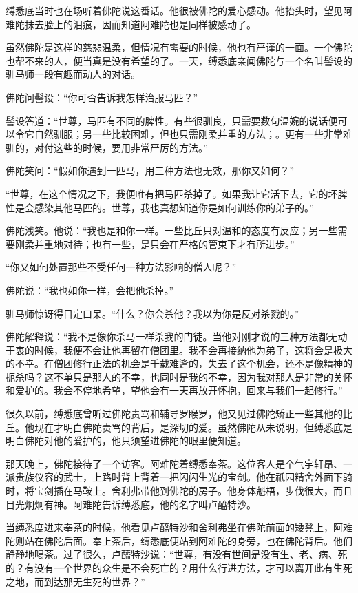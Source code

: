 \documentclass[12pt,twoside,openany]{book}
\begin{document}
缚悉底当时也在场听着佛陀说这番话。他很被佛陀的爱心感动。他抬头时，望见阿难陀抹去脸上的泪痕，因而知道阿难陀也是同样被感动了。

虽然佛陀是这样的慈悲温柔，但情况有需要的时候，他也有严谨的一面。一个佛陀也帮不来的人，便当真是没有希望的了。一天，缚悉底亲闻佛陀与一个名叫髻设的驯马师一段有趣而动人的对话。

佛陀问髻设：“你可否告诉我怎样治服马匹？”

髻设答道：“世尊，马匹有不同的脾性。有些很驯良，只需要数句温婉的说话便可以令它自然驯服；另一些比较困难，但也只需刚柔并重的方法；。更有一些非常难驯的，对付这些的时候，要用非常严厉的方法。”

佛陀笑问：“假如你遇到一匹马，用三种方法也无效，那你又如何？”

“世尊，在这个情况之下，我便唯有把马匹杀掉了。如果我让它活下去，它的坏脾性是会感染其他马匹的。世尊，我也真想知道你是如何训练你的弟子的。”

佛陀浅笑。他说：“我也是和你一样。一些比丘只对温和的态度有反应；另一些需要刚柔并重地对待；也有一些，是只会在严格的管束下才有所进步。”

“你又如何处置那些不受任何一种方法影响的僧人呢？”

佛陀说：“我也如你一样，会把他杀掉。”

驯马师惊讶得目定口呆。“什么？你会杀他？我以为你是反对杀戮的。”

佛陀解释说：“我不是像你杀马一样杀我的门徒。当他对刚才说的三种方法都无动于衷的时候，我便不会让他再留在僧团里。我不会再接纳他为弟子，这将会是极大的不幸。在僧团修行正法的机会是千载难逢的，失去了这个机会，还不是像精神的扼杀吗？这不单只是那人的不幸，也同时是我的不幸，因为我对那人是非常的关怀和爱护的。我会不停地希望，望他会有一天再放开怀抱，回来与我们一起修行。”

很久以前，缚悉底曾听过佛陀责骂和辅导罗睺罗，他又见过佛陀矫正一些其他的比丘。他现在才明白佛陀责骂的背后，是深切的爱。虽然佛陀从未说明，但缚悉底是明白佛陀对他的爱护的，他只须望进佛陀的眼里便知道。

那天晚上，佛陀接待了一个访客。阿难陀着缚悉奉茶。这位客人是个气宇轩昂、一派贵族仪容的武士，上路时背上背着一把闪闪生光的宝剑。他在祇园精舍外面下骑时，将宝剑插在马鞍上。舍利弗带他到佛陀的房子。他身体魁梧，步伐很大，而且目光炯炯有神。阿难陀告诉缚悉底，他的名字叫卢醯特沙。

当缚悉度进来奉茶的时候，他看见卢醯特沙和舍利弗坐在佛陀前面的矮凳上，阿难陀则站在佛陀后面。奉上茶后，缚悉底便站到阿难陀的身旁，也在佛陀背后。他们静静地喝茶。过了很久，卢醯特沙说：“世尊，有没有世间是没有生、老、病、死的？有没有一个世界的众生是不会死亡的？用什么行进方法，才可以离开此有生死之地，而到达那无生死的世界？”
\end{document}
